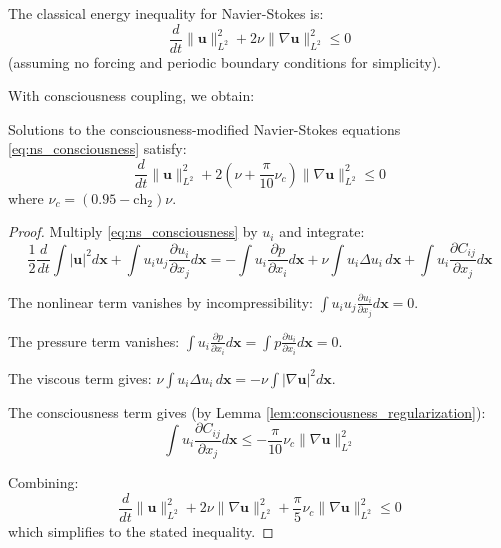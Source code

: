 The classical energy inequality for Navier-Stokes is:
\begin{equation}
\frac{d}{dt}\|\mathbf{u}\|_{L^2}^2 + 2\nu\|\nabla \mathbf{u}\|_{L^2}^2 \leq 0
\end{equation}
(assuming no forcing and periodic boundary conditions for simplicity).

With consciousness coupling, we obtain:

\begin{theorem}
\label{thm:enhanced_energy}
Solutions to the consciousness-modified Navier-Stokes equations \eqref{eq:ns_consciousness} satisfy:
\begin{equation}
\frac{d}{dt}\|\mathbf{u}\|_{L^2}^2 + 2\left(\nu + \frac{\pi}{10}\nu_c\right)\|\nabla \mathbf{u}\|_{L^2}^2 \leq 0
\end{equation}
where $\nu_c = (0.95 - \text{ch}_2)\nu$.
\end{theorem}

\begin{proof}
Multiply \eqref{eq:ns_consciousness} by $u_i$ and integrate:
\begin{equation}
\frac{1}{2}\frac{d}{dt}\int |\mathbf{u}|^2 d\mathbf{x} + \int u_i u_j \frac{\partial u_i}{\partial x_j} d\mathbf{x} = -\int u_i \frac{\partial p}{\partial x_i} d\mathbf{x} + \nu \int u_i \Delta u_i \, d\mathbf{x} + \int u_i \frac{\partial C_{ij}}{\partial x_j} d\mathbf{x}
\end{equation}

The nonlinear term vanishes by incompressibility: $\int u_i u_j \frac{\partial u_i}{\partial x_j} d\mathbf{x} = 0$.

The pressure term vanishes: $\int u_i \frac{\partial p}{\partial x_i} d\mathbf{x} = \int p \frac{\partial u_i}{\partial x_i} d\mathbf{x} = 0$.

The viscous term gives: $\nu \int u_i \Delta u_i \, d\mathbf{x} = -\nu \int |\nabla \mathbf{u}|^2 d\mathbf{x}$.

The consciousness term gives (by Lemma \ref{lem:consciousness_regularization}):
\begin{equation}
\int u_i \frac{\partial C_{ij}}{\partial x_j} d\mathbf{x} \leq -\frac{\pi}{10}\nu_c \|\nabla \mathbf{u}\|_{L^2}^2
\end{equation}

Combining:
\begin{equation}
\frac{d}{dt}\|\mathbf{u}\|_{L^2}^2 + 2\nu\|\nabla \mathbf{u}\|_{L^2}^2 + \frac{\pi}{5}\nu_c\|\nabla \mathbf{u}\|_{L^2}^2 \leq 0
\end{equation}
which simplifies to the stated inequality.
\end{proof}

